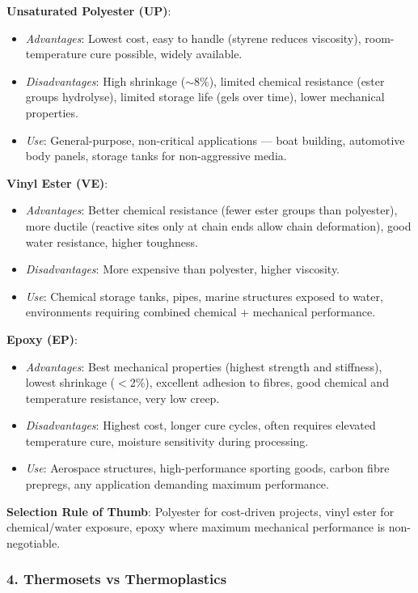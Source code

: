 \documentclass{NoteThesis/note-thesis}
\begin{document}
\textbf{Unsaturated Polyester (UP)}:
\begin{itemize}
    \item \textit{Advantages}: Lowest cost, easy to handle (styrene reduces viscosity), room-temperature cure possible, widely available.
    \item \textit{Disadvantages}: High shrinkage ($\sim$8\%), limited chemical resistance (ester groups hydrolyse), limited storage life (gels over time), lower mechanical properties.
    \item \textit{Use}: General-purpose, non-critical applications — boat building, automotive body panels, storage tanks for non-aggressive media.
\end{itemize}

\textbf{Vinyl Ester (VE)}:
\begin{itemize}
    \item \textit{Advantages}: Better chemical resistance (fewer ester groups than polyester), more ductile (reactive sites only at chain ends allow chain deformation), good water resistance, higher toughness.
    \item \textit{Disadvantages}: More expensive than polyester, higher viscosity.
    \item \textit{Use}: Chemical storage tanks, pipes, marine structures exposed to water, environments requiring combined chemical + mechanical performance.
\end{itemize}

\textbf{Epoxy (EP)}:
\begin{itemize}
    \item \textit{Advantages}: Best mechanical properties (highest strength and stiffness), lowest shrinkage ($<$2\%), excellent adhesion to fibres, good chemical and temperature resistance, very low creep.
    \item \textit{Disadvantages}: Highest cost, longer cure cycles, often requires elevated temperature cure, moisture sensitivity during processing.
    \item \textit{Use}: Aerospace structures, high-performance sporting goods, carbon fibre prepregs, any application demanding maximum performance.
\end{itemize}

\textbf{Selection Rule of Thumb}: Polyester for cost-driven projects, vinyl ester for chemical/water exposure, epoxy where maximum mechanical performance is non-negotiable.

\subsubsection*{4. Thermosets vs Thermoplastics}
\end{document}

